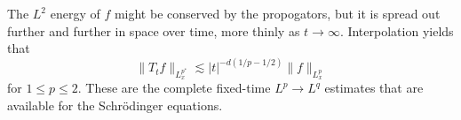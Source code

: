 %
%
%
%
%
%
%

%
%
%

The $L^2$ energy of $f$ might be conserved by the propogators, but it is spread out further and further in space over time, more thinly as $t \to \infty$. Interpolation yields that
%
\[ \| T_t f \|_{L^{p^*}_x} \lesssim |t|^{-d(1/p - 1/2)} \| f \|_{L^p_x} \]
%
for $1 \leq p \leq 2$. These are the complete fixed-time $L^p \to L^q$ estimates that are available for the Schr\"{o}dinger equations.

